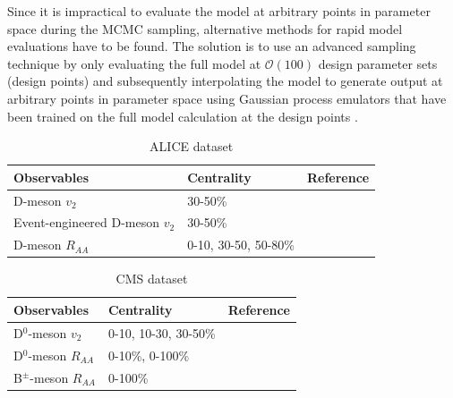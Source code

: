 \documentclass[aps, prc, reprint, amsmath, groupedaddress, nofootinbib]{revtex4-1}
\begin{document}
Since it is impractical to evaluate the model  at arbitrary points in parameter space during the MCMC sampling, alternative methods for rapid model evaluations have to be found.
The solution is to use an advanced sampling technique by only evaluating the full model at $\mathcal{O}(100)$ design parameter sets (design points) and subsequently interpolating the model to generate output at arbitrary points in parameter space using  Gaussian process emulators that have been trained on the full model calculation at the design points \cite{Rasmussen:2006gp}.
\begin{center}
\begin{table}[h]
\caption{ALICE dataset}\label{table:ALICE-obs} 
\begin{tabularx}{\columnwidth}{XXX}
\hline 
 Observables & Centrality & Reference\\ 
\hline 
D-meson $v_2$ & 30-50\% & \cite{Acharya:2017qps}\\ 
\hline 
Event-engineered D-meson $v_2$ & 30-50\% & \cite{Grosa:2017zcz}\\ 
\hline 
D-meson $R_{AA}$ & 0-10, 30-50, 50-80\% & \cite{Acharya:2018hre}\\
\hline 
\end{tabularx}
\end{table}
\begin{table}[h]
\caption{CMS dataset}\label{table:CMS-obs} 
\begin{tabularx}{\columnwidth}{XXX}
\hline 
Observables & Centrality & Reference\\ 
\hline 
D${}^0$-meson $v_2$ & 0-10, 10-30, 30-50\% & \cite{Sirunyan:2017plt}\\ 
\hline 
D${}^0$-meson $R_{AA}$ & 0-10\%, 0-100\% & \cite{Sirunyan:2017xss}\\ 
\hline 
B${}^{\pm}$-meson $R_{AA}$ & 0-100\% & \cite{Sirunyan:2017oug}\\ 
\hline 
\end{tabularx}
\end{table}
\end{center}
\end{document}
